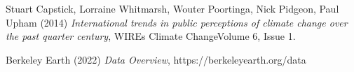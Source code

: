 \begin{thebibliography}{9}

Stuart Capstick, Lorraine Whitmarsh, Wouter Poortinga, Nick Pidgeon, Paul Upham (2014) \emph{International trends in public perceptions of climate change over the past quarter century}, WIREs Climate ChangeVolume 6, Issue 1.

Berkeley Earth (2022) \emph{Data Overview}, https://berkeleyearth.org/data

\end{thebibliography}